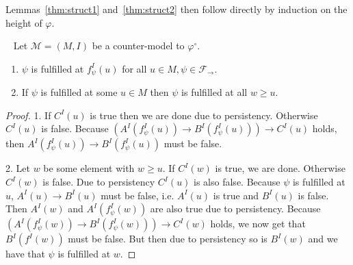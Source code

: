 \documentclass[runningheads]{llncs}
\begin{document}
Lemmas~\ref{thm:struct1} and~\ref{thm:struct2} then follow directly by induction on the height of $\varphi$.

\begin{lemma}~\label{thm:prop-countermodel-reduction2}
	Let $\mathcal M = (M, I)$ be a counter-model to $\mathcal \varphi^\circ$.
	\begin{enumerate}
		\item $\psi$ is fulfilled at $f_\psi^I(u)$ for all $u\in M, \psi\in\mathcal F_\to$.
		\item If $\psi$ is fulfilled at some $u\in M$ then $\psi$ is fulfilled at all $w\geq u$.
	\end{enumerate}
\end{lemma}

\begin{proof}
	1. If $C^I(u)$ is true then we are done due to persistency. Otherwise $C^I(u)$ is false.
	Because $(A^I(f_\psi^I(u))\to B^I(f_\psi^I(u)))\to C^I(u)$ holds, then $A^I(f_\psi^I(u))\to B^I(f_\psi^I(u))$ must be false.
	
	
	2. Let $w$ be some element with $w\geq u$.
	If $C^I(w)$ is true, we are done.
	Otherwise $C^I(w)$ is false.
	Due to persistency $C^I(u)$ is also false.
	Because $\psi$ is fulfilled at $u$, $A^I(u)\to B^I(u)$ must be false, i.e. $A^I(u)$ is true and $B^I(u)$ is false. Then $A^I(w)$ and $A^I(f^I_\psi(w))$ are also true due to persistency.
	Because $(A^I(f^I_\psi(w))\to B^I(f^I_\psi(w)))\to C^I(w)$ holds, we now get that  $B^I(f^I(w))$ must be false.
	But then due to persistency so is $B^I(w)$ and we have that $\psi$ is fulfilled at $w$.
\end{proof}
\end{document}
